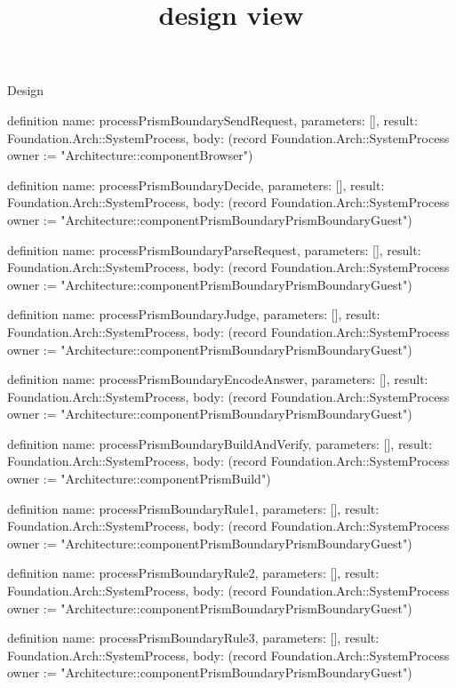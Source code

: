 \begin{lexlean}{Design}
\title{design view}
\begin{semanticmodule}
definition{
  name: processPrismBoundarySendRequest,
  parameters: [],
  result: Foundation.Arch::SystemProcess,
  body: (record Foundation.Arch::SystemProcess {owner := "Architecture::componentBrowser"})
}

definition{
  name: processPrismBoundaryDecide,
  parameters: [],
  result: Foundation.Arch::SystemProcess,
  body: (record Foundation.Arch::SystemProcess {owner := "Architecture::componentPrismBoundaryPrismBoundaryGuest"})
}

definition{
  name: processPrismBoundaryParseRequest,
  parameters: [],
  result: Foundation.Arch::SystemProcess,
  body: (record Foundation.Arch::SystemProcess {owner := "Architecture::componentPrismBoundaryPrismBoundaryGuest"})
}

definition{
  name: processPrismBoundaryJudge,
  parameters: [],
  result: Foundation.Arch::SystemProcess,
  body: (record Foundation.Arch::SystemProcess {owner := "Architecture::componentPrismBoundaryPrismBoundaryGuest"})
}

definition{
  name: processPrismBoundaryEncodeAnswer,
  parameters: [],
  result: Foundation.Arch::SystemProcess,
  body: (record Foundation.Arch::SystemProcess {owner := "Architecture::componentPrismBoundaryPrismBoundaryGuest"})
}

definition{
  name: processPrismBoundaryBuildAndVerify,
  parameters: [],
  result: Foundation.Arch::SystemProcess,
  body: (record Foundation.Arch::SystemProcess {owner := "Architecture::componentPrismBuild"})
}

definition{
  name: processPrismBoundaryRule1,
  parameters: [],
  result: Foundation.Arch::SystemProcess,
  body: (record Foundation.Arch::SystemProcess {owner := "Architecture::componentPrismBoundaryPrismBoundaryGuest"})
}

definition{
  name: processPrismBoundaryRule2,
  parameters: [],
  result: Foundation.Arch::SystemProcess,
  body: (record Foundation.Arch::SystemProcess {owner := "Architecture::componentPrismBoundaryPrismBoundaryGuest"})
}

definition{
  name: processPrismBoundaryRule3,
  parameters: [],
  result: Foundation.Arch::SystemProcess,
  body: (record Foundation.Arch::SystemProcess {owner := "Architecture::componentPrismBoundaryPrismBoundaryGuest"})
}


\end{semanticmodule}
\end{lexlean}

